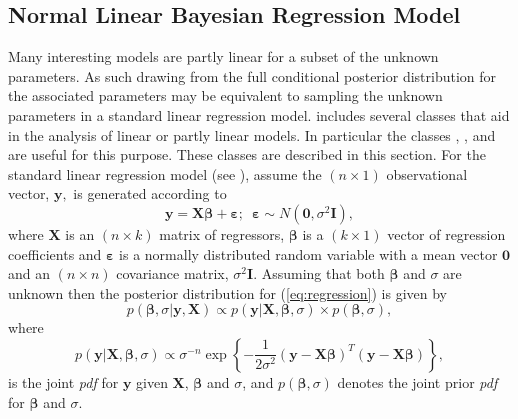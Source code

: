 \documentclass[article]{jss}
\begin{document}
\subsection{Normal Linear Bayesian Regression Model}
\label{sec: Regression Model}

Many interesting models are partly linear for a subset of the unknown
parameters. As such drawing from the full conditional posterior
distribution for the associated parameters may be equivalent to
sampling the unknown parameters in a standard linear regression model.
 includes several classes that aid in the analysis of
linear or partly linear models. In particular the classes
, ,
 and  are useful for
this purpose. These classes are described in this section.  For the
standard linear regression model (see \cite{Zellner1971}), assume the
$\left(n\times1\right)$ observational vector, $\bm{y},$ is generated
according to\begin{equation}
  \bm{y}=\bm{X}\bm{\beta}+\bm{\varepsilon};\,\,\,\bm{\varepsilon}\sim
  N(\bm{0},\sigma^{2}\bm{I}),\label{eq:regression}
\end{equation} where
$\bm{X}$ is an $(n\times k)$ matrix of regressors, $\bm{\beta}$ is a
$\left(k\times1\right)$ vector of regression coefficients and
$\bm{\varepsilon}$ is a normally distributed random variable with a
mean vector $\bm{0}$ and an $\left(n\times n\right)$ covariance
matrix, $\sigma^{2}\bm{I}.$ Assuming that both $\bm{\beta}$ and
$\sigma$ are unknown then the posterior distribution for
(\ref{eq:regression}) is given by\begin{equation}
  p(\bm{\beta},\sigma|\bm{y},\bm{X})\propto
  p(\bm{y}|\bm{X},\bm{\beta},\sigma)\times
  p(\bm{\beta},\sigma),\label{eq:post regression}
\end{equation} where
\begin{equation}
  p(\bm{y}|\bm{X},\bm{\beta},\sigma)\propto\sigma^{-n}\exp\left\{
    -\frac{1}{2\sigma^{2}}\left(\bm{y}-\bm{X}\bm{\beta}\right)^{T}\left(\bm{y}-\bm{X}\bm{\beta}\right)\right\}
  ,\label{eq:likelihood regression}
\end{equation} is the joint
\emph{pdf} for $\bm{y}$ given $\bm{X}$, $\bm{\beta}$ and
$\sigma$, and\emph{ $p(\bm{\beta},\sigma)$ } denotes the joint
prior \emph{pdf} for $\bm{\beta}$ and $\sigma$.
\end{document}

